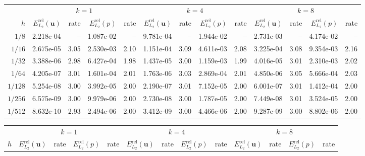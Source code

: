 \begin{landscape}
\thispagestyle{empty}
\begin{center}
\centering
{}
\label{tab:annulus_thieulot_v2_p1_cont}
\small
\begin{tabular}{
r rr rr rr rr rr rr
}
\toprule
& \multicolumn{4}{c}{$k=1$} & \multicolumn{4}{c}{$k=4$} & \multicolumn{4}{c}{$k=8$} \\
\cmidrule(lr){2-5}\cmidrule(lr){6-9}\cmidrule(lr){10-13}
$h$ & $E^{\mathrm{rel}}_{L_2}(\mathbf{u})$ & rate & $E^{\mathrm{rel}}_{L_2}(p)$ & rate & $E^{\mathrm{rel}}_{L_2}(\mathbf{u})$ & rate & $E^{\mathrm{rel}}_{L_2}(p)$ & rate & $E^{\mathrm{rel}}_{L_2}(\mathbf{u})$ & rate & $E^{\mathrm{rel}}_{L_2}(p)$ & rate \\
\midrule
$1/8$ & 2.218e-04 & -- & 1.087e-02 & -- & 9.781e-04 & -- & 1.944e-02 & -- & 2.731e-03 & -- & 4.174e-02 & -- \\
$1/16$ & 2.675e-05 & 3.05 & 2.530e-03 & 2.10 & 1.151e-04 & 3.09 & 4.611e-03 & 2.08 & 3.225e-04 & 3.08 & 9.354e-03 & 2.16 \\
$1/32$ & 3.388e-06 & 2.98 & 6.427e-04 & 1.98 & 1.437e-05 & 3.00 & 1.159e-03 & 1.99 & 4.016e-05 & 3.01 & 2.310e-03 & 2.02 \\
$1/64$ & 4.205e-07 & 3.01 & 1.601e-04 & 2.01 & 1.763e-06 & 3.03 & 2.869e-04 & 2.01 & 4.850e-06 & 3.05 & 5.666e-04 & 2.03 \\
$1/128$ & 5.254e-08 & 3.00 & 3.992e-05 & 2.00 & 2.190e-07 & 3.01 & 7.152e-05 & 2.00 & 6.001e-07 & 3.01 & 1.412e-04 & 2.00 \\
$1/256$ & 6.575e-09 & 3.00 & 9.979e-06 & 2.00 & 2.730e-08 & 3.00 & 1.787e-05 & 2.00 & 7.449e-08 & 3.01 & 3.524e-05 & 2.00 \\
$1/512$ & 8.632e-10 & 2.93 & 2.494e-06 & 2.00 & 3.412e-09 & 3.00 & 4.466e-06 & 2.00 & 9.287e-09 & 3.00 & 8.802e-06 & 2.00 \\
\bottomrule
\end{tabular}
\end{center}
\begin{center}
\centering
{}
\label{tab:annulus_thieulot_v3_p2_cont}
\small
\begin{tabular}{
r rr rr rr rr rr rr
}
\toprule
& \multicolumn{4}{c}{$k=1$} & \multicolumn{4}{c}{$k=4$} & \multicolumn{4}{c}{$k=8$} \\
\cmidrule(lr){2-5}\cmidrule(lr){6-9}\cmidrule(lr){10-13}
$h$ & $E^{\mathrm{rel}}_{L_2}(\mathbf{u})$ & rate & $E^{\mathrm{rel}}_{L_2}(p)$ & rate & $E^{\mathrm{rel}}_{L_2}(\mathbf{u})$ & rate & $E^{\mathrm{rel}}_{L_2}(p)$ & rate & $E^{\mathrm{rel}}_{L_2}(\mathbf{u})$ & rate & $E^{\mathrm{rel}}_{L_2}(p)$ & rate \\

\end{tabular}
\end{center}
\end{landscape}
